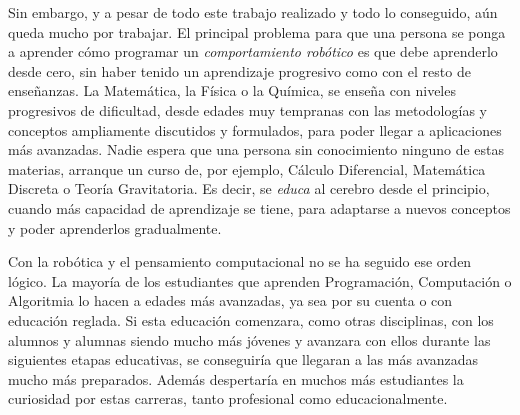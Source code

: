 Sin embargo, y a pesar de todo este trabajo realizado y todo lo conseguido, aún queda mucho por trabajar. El principal problema para que una persona se ponga a aprender cómo programar un \textit{comportamiento robótico} es que debe aprenderlo desde cero, sin haber tenido un aprendizaje progresivo como con el resto de enseñanzas. La Matemática, la Física o la Química, se enseña con niveles progresivos de dificultad, desde edades muy tempranas con las metodologías y conceptos ampliamente discutidos y formulados, para poder llegar a aplicaciones más avanzadas. Nadie espera que una persona sin conocimiento ninguno de estas materias, arranque  un curso de, por ejemplo, Cálculo Diferencial, Matemática Discreta o Teoría Gravitatoria. Es decir, se \textit{educa} al cerebro desde el principio, cuando más capacidad de aprendizaje se tiene, para adaptarse a nuevos conceptos y poder aprenderlos gradualmente. \\
\par Con la robótica y el pensamiento computacional no se ha seguido ese orden lógico. La mayoría de los estudiantes que aprenden Programación, Computación o Algoritmia lo hacen a edades más avanzadas, ya sea por su cuenta o con educación reglada. Si esta educación comenzara, como otras disciplinas, con los alumnos y alumnas siendo mucho más jóvenes y avanzara con ellos durante las siguientes etapas educativas, se conseguiría que llegaran a las más avanzadas mucho más preparados. Además despertaría en muchos más estudiantes la curiosidad por estas carreras, tanto profesional como educacionalmente.\\

